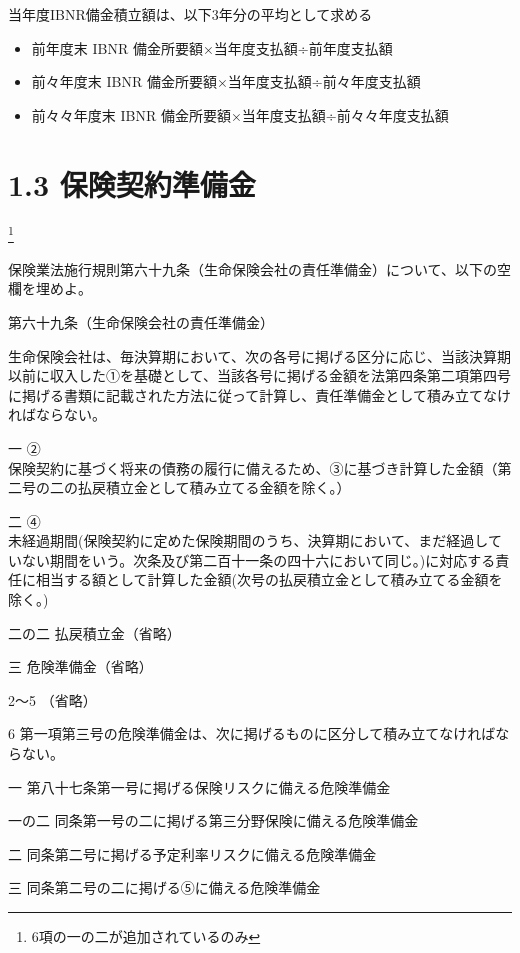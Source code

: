 \documentclass[report,gutter=10mm,fore-edge=10mm,uplatex,dvipdfmx]{jlreq}
\begin{document}
当年度IBNR備金積立額は、以下3年分の平均として求める

\begin{itemize}
\tightlist
\item
  前年度末 IBNR 備金所要額×当年度支払額÷前年度支払額
\item
  前々年度末 IBNR 備金所要額×当年度支払額÷前々年度支払額
\item
  前々々年度末 IBNR 備金所要額×当年度支払額÷前々々年度支払額
\end{itemize}

\section{1.3
保険契約準備金}

\footnote{6項の一の二が追加されているのみ}

保険業法施行規則第六十九条（生命保険会社の責任準備金）について、以下の空欄を埋めよ。

第六十九条（生命保険会社の責任準備金）

生命保険会社は、毎決算期において、次の各号に掲げる区分に応じ、当該決算期以前に収入した①を基礎として、当該各号に掲げる金額を法第四条第二項第四号に掲げる書類に記載された方法に従って計算し、責任準備金として積み立てなければならない。

一 ②\\
保険契約に基づく将来の債務の履行に備えるため、③に基づき計算した金額（第二号の二の払戻積立金として積み立てる金額を除く。）

二 ④\\
未経過期間(保険契約に定めた保険期間のうち、決算期において、まだ経過していない期間をいう。次条及び第二百十一条の四十六において同じ。)に対応する責任に相当する額として計算した金額(次号の払戻積立金として積み立てる金額を除く。)

二の二 払戻積立金（省略） 

三 危険準備金（省略） 

2～5 （省略） 

6 第一項第三号の危険準備金は、次に掲げるものに区分して積み立てなければならない。

一  第八十七条第一号に掲げる保険リスクに備える危険準備金 

一の二 同条第一号の二に掲げる第三分野保険に備える危険準備金 

二 同条第二号に掲げる予定利率リスクに備える危険準備金 

三 同条第二号の二に掲げる⑤に備える危険準備金 
\end{document}
